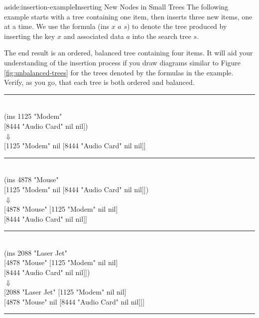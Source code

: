 \begin{aside}{aside:insertion-example}{Inserting New Nodes in Small Trees}
The following example starts with a tree containing one item,
then inserts three new items, one at a time.
We use the formula \textsf{(ins $x$ $a$ $s$)} to denote
the tree produced by inserting the key $x$ and associated
data $a$ into the search tree $s$.

The end result is an ordered,
balanced tree containing four items.
It will aid your understanding
of the insertion process if you draw diagrams similar to Figure
\ref{fig:unbalanced-trees} for the trees denoted by the formulas in the example.
Verify, as you go, that each tree is both ordered and balanced.
\begin{center}
\begin{tabbing}
%
\vspace*{-1.5\topsep}
\rule{\textwidth}{0.5pt}
\vspace*{-\topsep}
%
\\
\textsf{(ins} \= \textsf{1125 "Modem" }\\
     \> \textsf{{[}8444 "Audio Card" nil nil{]})} \\
     \> $\Downarrow$ \\
\textsf{{[}1125 "Modem" nil {[}8444 "Audio Card" nil nil{]}{]}} \\
%
\vspace*{-1.5\topsep}
\rule{\textwidth}{0.5pt}%
\vspace*{-\topsep}
%
\\
\textsf{(ins} \= \textsf{4878 "Mouse"} \\
     \> \textsf{{[}1125 "Modem" nil {[}8444 "Audio Card" nil nil{]}{]})} \\
     \> $\Downarrow$ \\
\textsf{{[}4878 "Mouse"} \= \textsf{{[}1125 "Modem"      nil nil{]}}  \\
              \> \textsf{{[}8444 "Audio Card" nil nil{]}{]}} \\
%
\vspace*{-1.5\topsep}
\rule{\textwidth}{0.5pt}%
\vspace*{-\topsep}
%
\\
\textsf{(ins} \= \textsf{2088 "Laser Jet"} \\
     \> \textsf{{[}4878 "Mouse"} \= \textsf{{[}1125 "Modem" nil nil{]}} \\
     \>               \> \textsf{{[}8444 "Audio Card" nil nil{]}{]})} \\
     \> $\Downarrow$ \\
\textsf{{[}2088 "Laser Jet"} \= \textsf{{[}1125 "Modem" nil nil{]}} \\
                  \> \textsf{{[}4878 "Mouse" nil {[}8444 "Audio Card" nil nil{]}{]}{]}} \\
%
\vspace*{-1.5\topsep}
\rule{\textwidth}{0.5pt}%
\vspace*{-\topsep}
%
\end{tabbing}
\end{center}
\end{aside}

